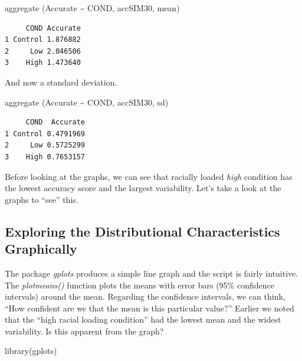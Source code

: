 \documentclass[
  english,
]{book}
\newenvironment{Shaded}{\begin{snugshade}}{\end{snugshade}}
\newcommand{\FunctionTok}[1]{\textcolor[rgb]{0.00,0.00,0.00}{#1}}
\newcommand{\NormalTok}[1]{#1}
\newcommand{\SpecialCharTok}[1]{\textcolor[rgb]{0.00,0.00,0.00}{#1}}
\begin{document}
\begin{Shaded}
\begin{Highlighting}[]
\FunctionTok{aggregate}\NormalTok{ (Accurate }\SpecialCharTok{\textasciitilde{}}\NormalTok{ COND, accSIM30, mean)}
\end{Highlighting}
\end{Shaded}

\begin{verbatim}
     COND Accurate
1 Control 1.876882
2     Low 2.046506
3    High 1.473640
\end{verbatim}

And now a standard deviation.

\begin{Shaded}
\begin{Highlighting}[]
\FunctionTok{aggregate}\NormalTok{ (Accurate }\SpecialCharTok{\textasciitilde{}}\NormalTok{ COND, accSIM30, sd)}
\end{Highlighting}
\end{Shaded}

\begin{verbatim}
     COND  Accurate
1 Control 0.4791969
2     Low 0.5725299
3    High 0.7653157
\end{verbatim}

Before looking at the graphs, we can see that racially loaded \emph{high} condition has the lowest accuracy score and the largest variability. Let's take a look at the graphs to ``see'' this.

\hypertarget{exploring-the-distributional-characteristics-graphically}{%
\subsection{Exploring the Distributional Characteristics Graphically}\label{exploring-the-distributional-characteristics-graphically}}

The package \emph{gplots} produces a simple line graph and the script is fairly intuitive. The \emph{plotmeans()} function plots the means with error bars (95\% confidence intervals) around the mean. Regarding the confidence intervals, we can think, ``How confident are we that the mean is this particular value?'' Earlier we noted that the ``high racial loading condition'' had the lowest mean and the widest variability. Is this apparent from the graph?

\begin{Shaded}
\begin{Highlighting}[]
\FunctionTok{library}\NormalTok{(gplots)}
\end{Highlighting}
\end{Shaded}
\end{document}
